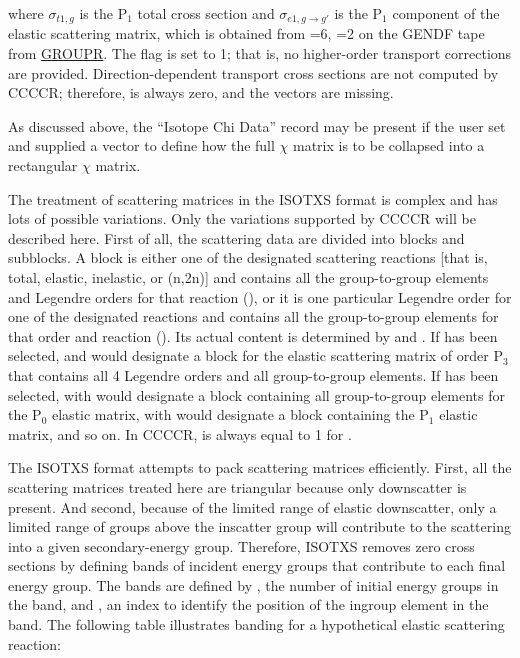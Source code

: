 \noindent
where $\sigma_{t1,g}$ is the P$_1$ total cross section and
$\sigma_{e1,g\rightarrow g'}$ is the P$_1$ component of the elastic
scattering matrix, which is obtained from =6,
=2 on the GENDF tape from
\hyperlink{sGROUPRhy}{GROUPR}.  The flag  is set to
1; that is, no higher-order transport corrections are
provided.  Direction-dependent transport cross sections are not
computed by CCCCR; therefore,  is always zero, and
the  vectors are missing.

As discussed above, the ``Isotope Chi Data'' record may be present
if the user set  and supplied a  vector to
define how the full $\chi$ matrix is to be collapsed into a
rectangular $\chi$ matrix.

The treatment of scattering matrices in the ISOTXS format is complex
and has lots of possible variations.  Only the variations supported
by CCCCR will be described here.  First of all, the scattering data are
divided into blocks and subblocks.  A block is either one of the
designated scattering reactions [that is, total, elastic, inelastic,
or (n,2n)] and contains all the group-to-group elements and Legendre
orders for that reaction (), or it is one particular
Legendre order for one of the designated reactions and contains all
the group-to-group elements for that order and reaction ().
Its actual content is determined by  and .
If  has been selected,  and
 would designate a block for the elastic scattering
matrix of order P$_3$ that contains all 4 Legendre orders and all
group-to-group elements.  If  has been selected,
 with  would designate a block
containing all group-to-group elements for the P$_0$ elastic matrix,
 with  would designate
a block containing the P$_1$ elastic matrix, and so on.  In CCCCR,
 is always equal to 1 for .

The ISOTXS format attempts to pack scattering matrices efficiently.
First, all the scattering matrices treated here are triangular
because only downscatter is present.  And second, because of the
limited range of elastic downscatter, only a limited range of groups
above the inscatter group will contribute to the scattering into
a given secondary-energy group.  Therefore, ISOTXS removes zero
cross sections by defining bands of incident energy groups that
contribute to each final energy group.  The bands are defined by
, the number of initial energy groups in the band,
and , an index to identify the position of the ingroup
element in the band.  The following table illustrates banding for
a hypothetical elastic scattering reaction:


